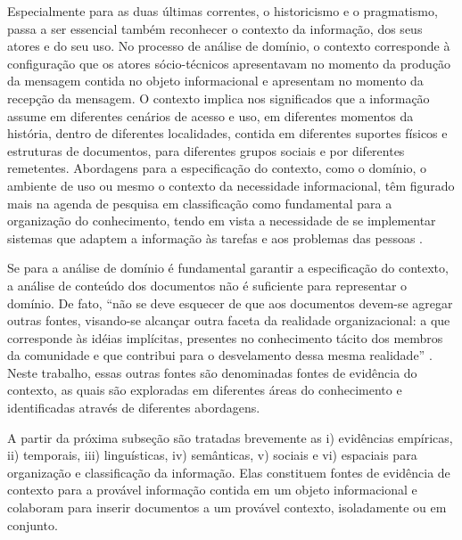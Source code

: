 Especialmente para as duas últimas correntes, o historicismo e o pragmatismo, passa a ser essencial também reconhecer o contexto da informação, dos seus atores e do seu uso. No processo de análise de domínio, o contexto corresponde à configuração que os atores sócio-técnicos apresentavam no momento da produção da mensagem contida no objeto informacional e apresentam no momento da recepção da mensagem. O contexto implica nos significados que a informação assume em diferentes cenários de acesso e uso, em diferentes momentos da história, dentro de diferentes localidades, contida em diferentes suportes físicos e estruturas de documentos, para diferentes grupos sociais e por diferentes remetentes. Abordagens para a especificação do contexto, como o domínio, o ambiente de uso ou mesmo o contexto da necessidade informacional, têm figurado mais na agenda de pesquisa em classificação como fundamental para a organização do conhecimento, tendo em vista a necessidade de se implementar sistemas que adaptem a informação às tarefas e aos problemas das pessoas \cite{solomon2002}. 

Se para a análise de domínio é fundamental garantir a especificação do contexto, a análise de conteúdo dos documentos não é suficiente para representar o domínio. De fato, ``não se deve esquecer de que aos documentos devem-se agregar outras fontes, visando-se alcançar outra faceta da realidade organizacional: a que corresponde às idéias implícitas, presentes no conhecimento tácito dos membros da comunidade e que contribui para o desvelamento dessa mesma realidade'' \cite{alvarenga12}. Neste trabalho, essas outras fontes são denominadas fontes de evidência do contexto, as quais são exploradas em diferentes áreas do conhecimento e identificadas através de diferentes abordagens.

A partir da próxima subseção são tratadas brevemente as i) evidências empíricas, ii) temporais, iii) linguísticas, iv) semânticas, v) sociais e vi) espaciais para organização e classificação da informação. Elas constituem fontes de evidência de contexto para a provável informação contida em um objeto informacional e colaboram para inserir documentos a um provável contexto, isoladamente ou em conjunto.



